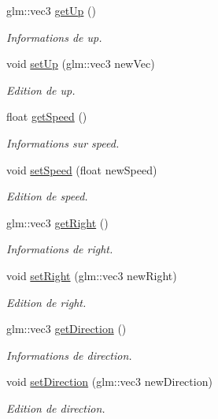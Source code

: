 \begin{DoxyCompactItemize}
glm\+::vec3 \hyperlink{classglimac_1_1Controls_a6d030431b293ace529d7696c2444fd68}{get\+Up} ()
\begin{DoxyCompactList}\small\item\em Informations de up. \end{DoxyCompactList}\item 
void \hyperlink{classglimac_1_1Controls_aa9d4839c153b46efa419af8599d07d7b}{set\+Up} (glm\+::vec3 new\+Vec)
\begin{DoxyCompactList}\small\item\em Edition de up. \end{DoxyCompactList}\item 
float \hyperlink{classglimac_1_1Controls_aac3ad087d701019eede9beb547fe7425}{get\+Speed} ()
\begin{DoxyCompactList}\small\item\em Informations sur speed. \end{DoxyCompactList}\item 
void \hyperlink{classglimac_1_1Controls_abdd360d577810fddb2f01a96dc5baacc}{set\+Speed} (float new\+Speed)
\begin{DoxyCompactList}\small\item\em Edition de speed. \end{DoxyCompactList}\item 
glm\+::vec3 \hyperlink{classglimac_1_1Controls_a65b6d95a26fab1a0fba7b3e0dfbf7178}{get\+Right} ()
\begin{DoxyCompactList}\small\item\em Informations de right. \end{DoxyCompactList}\item 
void \hyperlink{classglimac_1_1Controls_ae42a699a28d327cd7c9e1d01e78ae693}{set\+Right} (glm\+::vec3 new\+Right)
\begin{DoxyCompactList}\small\item\em Edition de right. \end{DoxyCompactList}\item 
glm\+::vec3 \hyperlink{classglimac_1_1Controls_acb5245c5972c2d065f693e6899b805f6}{get\+Direction} ()
\begin{DoxyCompactList}\small\item\em Informations de direction. \end{DoxyCompactList}\item 
void \hyperlink{classglimac_1_1Controls_aeecf9a01133bdfa844e6282437601a00}{set\+Direction} (glm\+::vec3 new\+Direction)
\begin{DoxyCompactList}\small\item\em Edition de direction. \end{DoxyCompactList}\end{DoxyCompactItemize}


